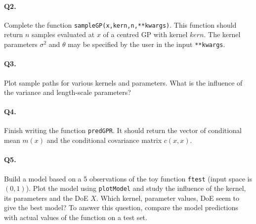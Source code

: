 \documentclass[12pt]{scrartcl}
\begin{document}
\paragraph{Q2.} Complete the function \texttt{sampleGP(x,kern,n,**kwargs)}. This function should return $n$ samples evaluated at $x$ of a centred GP with kernel $kern$. The kernel parameters $\sigma^2$ and $\theta$ may be specified by the user in the input \texttt{**kwargs}.

\paragraph{Q3.} Plot sample paths for various kernels and parameters. What is the influence of the variance and length-scale parameters?

\paragraph{Q4.} Finish writing the function \texttt{predGPR}. It should return the vector of conditional mean $m(x)$ and the conditional covariance matrix $c(x,x)$.

\paragraph{Q5.} Build a model based on a 5 observations of the toy function \texttt{ftest} (input space is $(0,1)$). Plot the model using \texttt{plotModel} and study the influence of the kernel, its parameters and the DoE $X$. Which kernel, parameter values, DoE seem to give the best model? To answer this question, compare the model predictions with actual values of the function on a test set.
\end{document}
